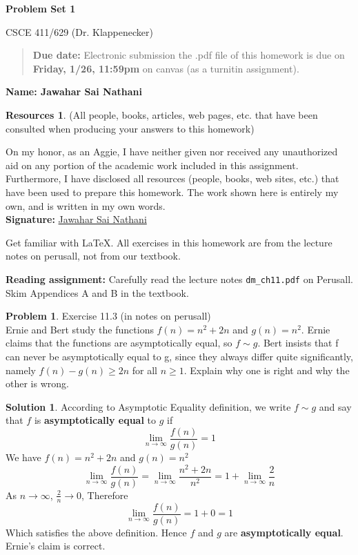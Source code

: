 \documentclass{article}
\theoremstyle{definition}
\newtheorem{problem}{Problem}
\newtheorem*{solution}{Solution}
\newtheorem*{resources}{Resources}
\newcommand{\name}[1]{\noindent\textbf{Name: #1}}
\newcommand{\honor}{\noindent On my honor, as an Aggie, I have neither
  given nor received any unauthorized aid on any portion of the
  academic work included in this assignment. Furthermore, I have
  disclosed all resources (people, books, web sites, etc.) that have
  been used to prepare this homework. The work shown here is entirely
  my own, and is written in my own words.\\[1ex]
 \textbf{Signature:} \underline{Jawahar Sai Nathani}{\hspace*{5cm}} }
\newcommand{\problemset}[1]{\begin{center}\textbf{Problem Set #1}\end{center}}
\newcommand{\duedate}[1]{\begin{quote}\textbf{Due date:} Electronic
    submission the .pdf file of this homework is due on \textbf{#1} on canvas
    (as a turnitin assignment).\end{quote}}
\begin{document}
\problemset{1}
\centerline{CSCE 411/629 (Dr. Klappenecker) }

\duedate{Friday, 1/26, 11:59pm}
\name{ Jawahar Sai Nathani}
\begin{resources} (All people, books, articles, web pages, etc. that
  have been consulted when producing your answers to this homework)
\end{resources}
\honor

\newpage%
\noindent Get familiar with \LaTeX. All exercises in this homework are from the lecture
notes on perusall, not from our textbook. \medskip

\noindent\textbf{Reading assignment:} Carefully read the lecture notes
\verb|dm_ch11.pdf| on Perusall. Skim Appendices A and B in the textbook. 

\begin{problem}
Exercise 11.3 (in notes on perusall) \\
Ernie and Bert study the functions $f(n) = n^2 + 2n$ and $g(n) = n^2$. Ernie claims that the functions are asymptotically equal, so $f \sim g$. Bert insists that f can never be asymptotically equal to g, since they always differ quite significantly, namely $f(n) - g(n) \geq 2n$ for all $n \geq 1$. Explain why one is right and why the other is wrong.
\begin{solution}
 According to Asymptotic Equality definition, we write $f \sim g$ and say that $f$ is \textbf{asymptotically equal} to $g$ if 
\[ \lim_{n \to \infty} \frac{f(n)}{g(n)} = 1\]
We have $f(n) = n^2 + 2n$ and $g(n) = n^2$
\[ \lim_{n \to \infty} \frac{f(n)}{g(n)} = \lim_{n \to \infty} \frac{n^2 + 2n}{n^2} = 1 + \lim_{n \to \infty} \frac{2}{n} \]
As $n \to \infty$, $\frac{2}{n} \to 0$, Therefore
\[ \lim_{n \to \infty} \frac{f(n)}{g(n)} = 1 + 0 = 1 \]
Which satisfies the above definition. Hence $f$ and $g$ are \textbf{asymptotically equal}. Ernie's claim is correct.
\end{solution}
\end{problem}
\end{document}
